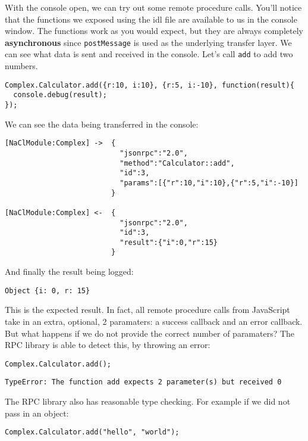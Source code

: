 With the console open, we can try out some remote procedure calls.
You'll notice that the functions we exposed using the idl file are
available to us in the console window. The functions work as you would
expect, but they are always completely \textbf{asynchronous} since
\texttt{postMessage} is used as the underlying transfer layer. We can
see what data is sent and received in the console. Let's call
\texttt{add} to add two numbers.

\begin{verbatim}
Complex.Calculator.add({r:10, i:10}, {r:5, i:-10}, function(result){
  console.debug(result);
});
\end{verbatim}

We can see the data being transferred in the console:

\begin{verbatim}
[NaClModule:Complex] ->  {
                           "jsonrpc":"2.0",
                           "method":"Calculator::add",
                           "id":3,
                           "params":[{"r":10,"i":10},{"r":5,"i":-10}]
                         }

[NaClModule:Complex] <-  {
                           "jsonrpc":"2.0",
                           "id":3,
                           "result":{"i":0,"r":15}
                         }
\end{verbatim}

And finally the result being logged:

\begin{verbatim}
Object {i: 0, r: 15}
\end{verbatim}

This is the expected result. In fact, all remote procedure calls from
JavaScript take in an extra, optional, 2 paramaters: a success callback
and an error callback. But what happens if we do not provide the correct
number of paramaters? The RPC library is able to detect this, by
throwing an error:

\begin{verbatim}
Complex.Calculator.add();
\end{verbatim}

\begin{verbatim}
TypeError: The function add expects 2 parameter(s) but received 0
\end{verbatim}

The RPC library also has reasonable type checking. For example if we did
not pass in an object:

\begin{verbatim}
Complex.Calculator.add("hello", "world");
\end{verbatim}

